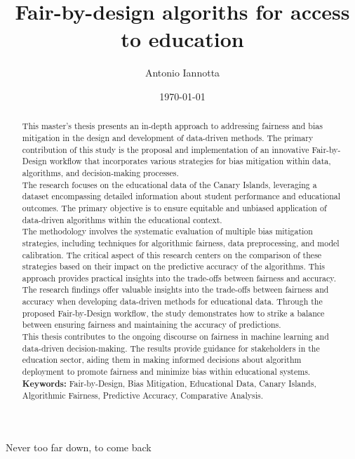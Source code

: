 \documentclass[12pt,a4paper,openright,twoside]{book}
\title{Fair-by-design algoriths for access to education}
\author{Antonio Iannotta}
\date{\today}
\begin{document}
	
\frontmatter



\begin{abstract}

    This master's thesis presents an in-depth approach to addressing fairness and bias mitigation in the design and development of data-driven methods. The primary contribution of this study is the proposal and implementation of an innovative Fair-by-Design workflow that incorporates various strategies for bias mitigation within data, algorithms, and decision-making processes. \\
    The research focuses on the educational data of the Canary Islands, leveraging a dataset encompassing detailed information about student performance and educational outcomes. The primary objective is to ensure equitable and unbiased application of data-driven algorithms within the educational context. \\
    The methodology involves the systematic evaluation of multiple bias mitigation strategies, including techniques for algorithmic fairness, data preprocessing, and model calibration. The critical aspect of this research centers on the comparison of these strategies based on their impact on the predictive accuracy of the algorithms. This approach provides practical insights into the trade-offs between fairness and accuracy. \\
    The research findings offer valuable insights into the trade-offs between fairness and accuracy when developing data-driven methods for educational data. Through the proposed Fair-by-Design workflow, the study demonstrates how to strike a balance between ensuring fairness and maintaining the accuracy of predictions. \\
    This thesis contributes to the ongoing discourse on fairness in machine learning and data-driven decision-making. The results provide guidance for stakeholders in the education sector, aiding them in making informed decisions about algorithm deployment to promote fairness and minimize bias within educational systems. \\
    \textbf{Keywords:} Fair-by-Design, Bias Mitigation, Educational Data, Canary Islands, Algorithmic Fairness, Predictive Accuracy, Comparative Analysis.
    
    \end{abstract}
    


\begin{acknowledgements} %
Never too far down, to come back
\end{acknowledgements}
\end{document}
